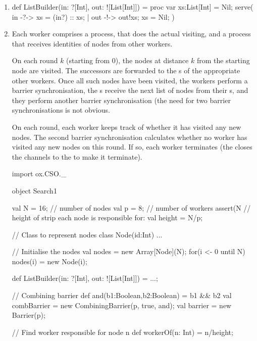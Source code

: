 \begin{answer}
\begin{enumerate}
\item
\begin{scala}
def ListBuilder(in: ?[Int], out: ![List[Int]]) = proc{
  var xs:List[Int] = Nil;
  serve(
    in -?-> { xs = (in?) :: xs; }
    | out -!-> { out!xs; xs = Nil; }
  )
}
\end{scala}

\item
Each worker comprises a  process, that does the actual
visiting, and a  process that receives identities of nodes
from other workers.

On each round $k$ (starting from 0), the nodes at distance $k$ from the
starting node are visited.  The successors are forwarded to the
s of the appropriate other workers.  Once all such nodes
have been visited, the workers perform a barrier synchronisation, the
s receive the next list of nodes from their
s, and they perform another barrier synchronisation (the
need for two barrier synchronisations is not obvious. 

On each round, each worker keeps track of whether it has visited any new
nodes.  The second barrier synchronisation calculates whether no worker has
visited any new nodes on this round.  If so, each worker terminates (the
 closes the channels to the  to make it
terminate). 


\begin{scala}
import ox.CSO._

object Search1{
  val N = 16; // number of nodes
  val p = 8; // number of workers
  assert(N%
  // height of strip each node is responsible for:
  val height = N/p;

  // Class to represent nodes
  class Node(id:Int){ ... }

  // Initialise the nodes
  val nodes = new Array[Node](N);
  for(i <- 0 until N) nodes(i) = new Node(i);

  def ListBuilder(in: ?[Int], out: ![List[Int]]) = ...;

  // Combining barrier
  def and(b1:Boolean,b2:Boolean) = b1 && b2
  val combBarrier = new CombiningBarrier(p, true, and);
  val barrier = new Barrier(p);

  // Find worker responsible for node n
  def workerOf(n: Int) = n/height;

}
\end{scala}
\end{enumerate}
\end{answer}
